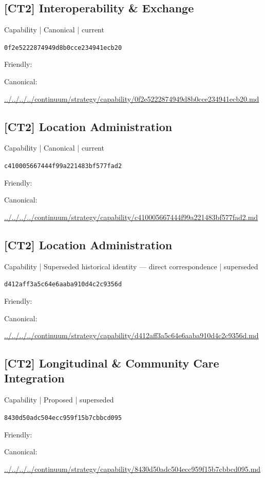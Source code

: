 \documentclass[10pt,a4paper]{article}
\begin{document}
\subsection*{[CT2] Interoperability \& Exchange}
{\small Capability | Canonical | current}\par
\texttt{0f2e5222874949d8b0cce234941ecb20}\par
Friendly: \par
Canonical: \par
{\footnotesize\url{../../../../continuum/strategy/capability/0f2e5222874949d8b0cce234941ecb20.md}}\par
\subsection*{[CT2] Location Administration}
{\small Capability | Canonical | current}\par
\texttt{c410005667444f99a221483bf577fad2}\par
Friendly: \par
Canonical: \par
{\footnotesize\url{../../../../continuum/strategy/capability/c410005667444f99a221483bf577fad2.md}}\par
\subsection*{[CT2] Location Administration}
{\small Capability | Superseded historical identity — direct correspondence | superseded}\par
\texttt{d412aff3a5c64e6aaba910d4c2c9356d}\par
Friendly: \par
Canonical: \par
{\footnotesize\url{../../../../continuum/strategy/capability/d412aff3a5c64e6aaba910d4c2c9356d.md}}\par
\subsection*{[CT2] Longitudinal \& Community Care Integration}
{\small Capability | Proposed | superseded}\par
\texttt{8430d50adc504ecc959f15b7cbbcd095}\par
Friendly: \par
Canonical: \par
{\footnotesize\url{../../../../continuum/strategy/capability/8430d50adc504ecc959f15b7cbbcd095.md}}\par
\end{document}
